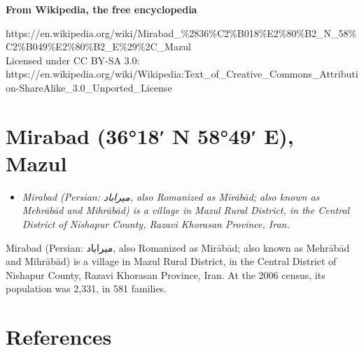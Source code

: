 \textbf{From Wikipedia, the free encyclopedia}

https://en.wikipedia.org/wiki/Mirabad\_\%2836\%C2\%B018\%E2\%80\%B2\_N\_58\%C2\%B049\%E2\%80\%B2\_E\%29\%2C\_Mazul\\
Licensed under CC BY-SA 3.0:\\
https://en.wikipedia.org/wiki/Wikipedia:Text\_of\_Creative\_Commons\_Attribution-ShareAlike\_3.0\_Unported\_License

\section{Mirabad (36°18′ N 58°49′ E),
Mazul}\label{mirabad-3618-n-5849-e-mazul}

\begin{itemize}
\item
  \emph{Mirabad (Persian: ميراباد‎, also Romanized as Mīrābād; also
  known as Mehrābād and Mihrābād) is a village in Mazul Rural District,
  in the Central District of Nishapur County, Razavi Khorasan Province,
  Iran.}
\end{itemize}

Mirabad (Persian: ميراباد‎, also Romanized as Mīrābād; also known as
Mehrābād and Mihrābād) is a village in Mazul Rural District, in the
Central District of Nishapur County, Razavi Khorasan Province, Iran. At
the 2006 census, its population was 2,331, in 581 families.

\section{References}\label{references}
